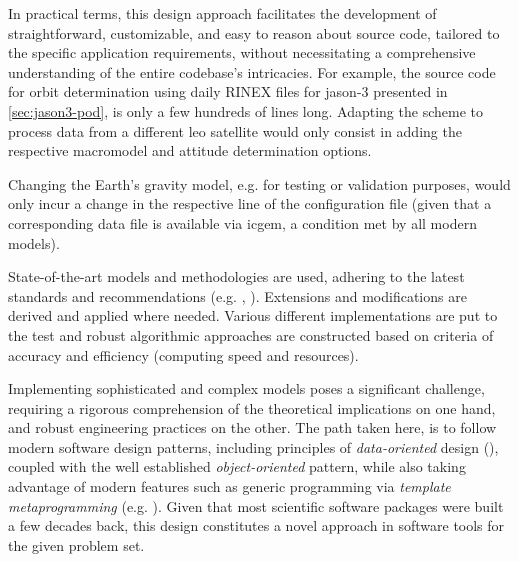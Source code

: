 \iffalse
Practically, this design enables the creation of simple, customizable, easy to
reason about, application-targeted source code to handle the problem at hand, without 
having to be aware of the full codebase complexity.
\fi
In practical terms, this design approach facilitates the development of straightforward,
customizable, and easy to reason about source code, tailored to the specific application
requirements, without necessitating a comprehensive understanding of the entire
codebase's intricacies.
For example, the source code
for orbit determination using daily RINEX files for \gls{jason}-3 presented in 
\autoref{sec:jason3-pod}, is only a few hundreds of lines long. Adapting the scheme 
to process data from a different \gls{leo} satellite would only consist in adding 
the respective macromodel and attitude determination options.

Changing the Earth's gravity model, e.g. for testing or validation purposes, 
would only incur a change in the respective line of the configuration file (given 
that a corresponding data file is available via \gls{icgem}, a condition met 
by all modern models).

State-of-the-art models and methodologies are used, adhering to the latest 
standards and recommendations (e.g. \cite{IdsRecommendationItrf2020}, \cite{iers2010}). 
Extensions and modifications are derived and applied where needed. Various different 
implementations are put to the test and robust algorithmic approaches are constructed 
based on criteria of accuracy and efficiency (computing speed and resources).

Implementing sophisticated and complex models poses a significant challenge, requiring a
rigorous comprehension of the theoretical implications on one hand, and robust
engineering practices on the other.
The path taken here, is to follow modern software design
patterns, including principles of \emph{data-oriented} design (\cite{Fabian2018}), coupled with 
the well established \emph{object-oriented} pattern, while also taking advantage of 
modern features such as generic programming via \emph{template metaprogramming} 
(e.g. \cite{Gawlik2018}). Given that most scientific software packages were built 
a few decades back, this design constitutes a novel approach in software tools for 
the given problem set.

